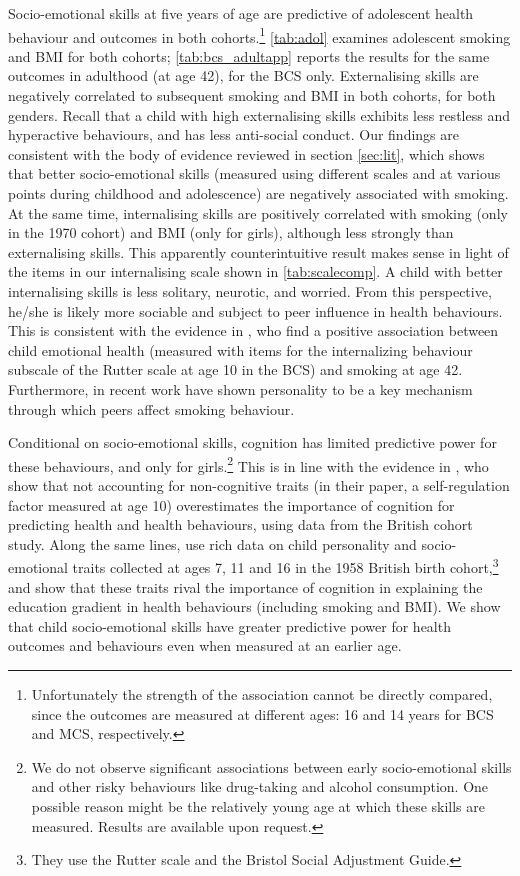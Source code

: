 Socio-emotional skills at five years of age are predictive of adolescent health behaviour and outcomes in both cohorts.\footnote{Unfortunately the strength of the association cannot be directly compared, since the outcomes are measured at different ages: 16 and 14 years for BCS and MCS, respectively.} \autoref{tab:adol} examines adolescent smoking and BMI for both cohorts; \autoref{tab:bcs_adultapp} reports the results for the same outcomes in adulthood (at age 42), for the BCS only. Externalising skills are negatively correlated to subsequent smoking and BMI in both cohorts, for both genders. Recall that a child with high externalising skills exhibits less restless and hyperactive behaviours, and has less anti-social conduct. Our findings are consistent with the body of evidence reviewed in section \ref{sec:lit}, which shows that better socio-emotional skills (measured using different scales and at various points during childhood and adolescence) are negatively associated with smoking. At the same time, internalising skills are positively correlated with smoking (only in the 1970 cohort) and BMI (only for girls), although less strongly than externalising skills. This apparently counterintuitive result makes sense in light of the items in our internalising scale shown in \autoref{tab:scalecomp}. A child with better internalising skills is less solitary, neurotic, and worried. From this perspective, he/she is likely more sociable and subject to peer influence in health behaviours. This is consistent with the evidence in \citet{Goodman2015}, who find a positive association between child emotional health (measured with items for the internalizing behaviour subscale of the Rutter scale at age 10 in the BCS) and smoking at age 42. Furthermore, in recent work \citet{Hsieh2018} have shown personality to be a key mechanism through which peers affect smoking behaviour.

Conditional on socio-emotional skills, cognition has limited predictive power for these behaviours, and only for girls.\footnote{We do not observe significant associations between early socio-emotional skills and other risky behaviours like drug-taking and alcohol consumption. One possible reason might be the relatively young age at which these skills are measured. Results are available upon request.} This is in line with the evidence in \citet{Conti2010}, who show that not accounting for non-cognitive traits (in their paper, a self-regulation factor measured at age 10) overestimates the importance of cognition for predicting health and health behaviours, using data from the British cohort study. Along the same lines, \citet{Conti2013a} use rich data on child personality and socio-emotional traits collected at ages 7, 11 and 16 in the 1958 British birth cohort,\footnote{They use the Rutter scale and the Bristol Social Adjustment Guide.} and show that these traits rival the importance of cognition in explaining the education gradient in health behaviours (including smoking and BMI). We show that child socio-emotional skills have greater predictive power for health outcomes and behaviours even when measured at an earlier age.

